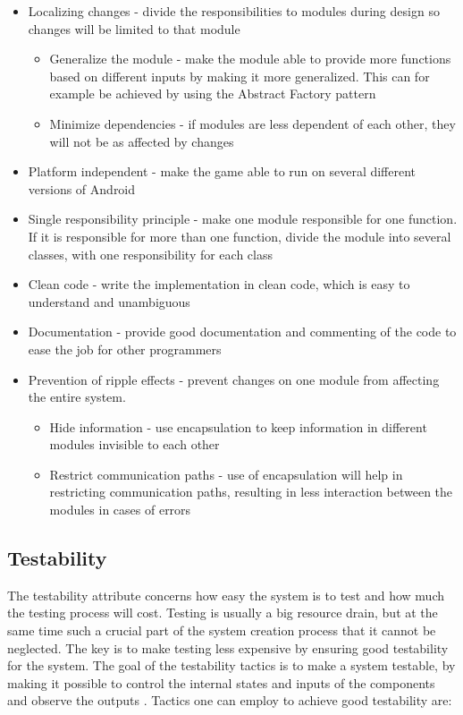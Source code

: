\begin{itemize}
	\item Localizing changes - divide the responsibilities to modules during design so changes will be limited to that module
        \begin{itemize}
	\item Generalize the module - make the module able to provide more functions based on different inputs by making it more generalized. This can for example be achieved by using the Abstract Factory pattern
	\item Minimize dependencies - if modules are less dependent of each other, they will not be as affected by changes
	\end{itemize}
	\item Platform independent - make the game able to run on several different versions of Android
	\item Single responsibility principle - make one module responsible for one function. If it is responsible for more than one function, divide the module into several classes, with one responsibility for each class
	\item Clean code - write the implementation in clean code, which is easy to understand and unambiguous
	\item Documentation - provide good documentation and commenting of the code to ease the job for other programmers
	
	\item Prevention of ripple effects - prevent changes on one module from affecting the entire system.
        \begin{itemize}
	\item Hide information - use encapsulation to keep information in different modules invisible to each other
	\item Restrict communication paths - use of encapsulation will help in restricting communication paths, resulting in less interaction between the modules in cases of errors
        \end{itemize}
\end{itemize}


\subsection{Testability}
The testability attribute concerns how easy the system is to test and how much the testing process will cost. Testing is usually a big resource drain, but at the same time such a crucial part of the system creation process that it cannot be neglected. The key is to make testing less expensive by ensuring good testability for the system. The goal of the testability tactics is to make a system testable, by making it possible to control the internal states and inputs of the components and observe the outputs \cite{bass2003software}. Tactics one can employ to achieve good testability are: 

